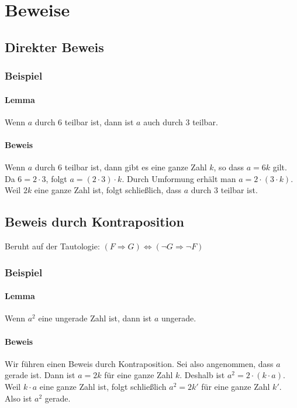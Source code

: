 \documentclass[10pt,a4paper,twoside,twocolumn]{article}
\begin{document}
	\section{Beweise}
	
	\subsection{Direkter Beweis}
	
	\subsubsection{Beispiel}
	
	\paragraph{Lemma} Wenn $ a $ durch 6 teilbar ist, dann ist $ a $ auch durch 3 teilbar.
	
	\paragraph{Beweis} Wenn $ a $ durch 6 teilbar ist, dann gibt es eine ganze Zahl $ k $, so dass $ a = 6k $ gilt. Da $ 6 = 2 \cdot 3 $, folgt $ a = (2 \cdot 3) \cdot k $. Durch Umformung erhält man $ a = 2 \cdot (3 \cdot k) $. Weil $ 2k $ eine ganze Zahl ist, folgt schließlich, dass $ a $ durch 3 teilbar ist.
	
	\subsection{Beweis durch Kontraposition}
	Beruht auf der Tautologie: $ (F \Rightarrow G) \Leftrightarrow (\neg G \Rightarrow \neg F) $
	
	\subsubsection{Beispiel}
	
	\paragraph{Lemma} Wenn $ a^2 $ eine ungerade Zahl ist, dann ist $ a $ ungerade.
	
	\paragraph{Beweis} Wir führen einen Beweis durch Kontraposition. Sei also angenommen, dass $ a $ gerade ist. Dann ist $ a = 2k $ für eine ganze Zahl $ k $. Deshalb ist $ a^2 = 2 \cdot (k \cdot a) $.
	Weil $ k \cdot a $ eine ganze Zahl ist, folgt schließlich $ a^2 = 2k' $ für eine ganze Zahl $ k' $. Also ist $ a^2 $ gerade.
	
\end{document}
